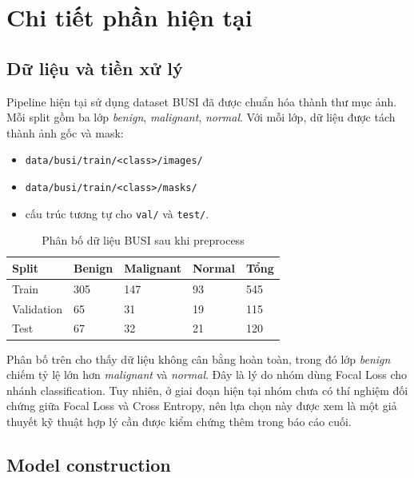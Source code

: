 \documentclass[12pt,a4paper]{article}
\begin{document}
\section{Chi tiết phần hiện tại}

\subsection{Dữ liệu và tiền xử lý}

Pipeline hiện tại sử dụng dataset BUSI đã được chuẩn hóa thành thư mục ảnh. Mỗi split gồm ba lớp \textit{benign}, \textit{malignant}, \textit{normal}. Với mỗi lớp, dữ liệu được tách thành ảnh gốc và mask:

\begin{itemize}
    \item \texttt{data/busi/train/<class>/images/}
    \item \texttt{data/busi/train/<class>/masks/}
    \item cấu trúc tương tự cho \texttt{val/} và \texttt{test/}.
\end{itemize}

\begin{table}[H]
\centering
\caption{Phân bố dữ liệu BUSI sau khi preprocess}
\renewcommand{\arraystretch}{1.25}
\begin{tabular}{p{2.6cm} p{2.5cm} p{2.8cm} p{2.5cm} p{2.5cm}}
\toprule
\textbf{Split} & \textbf{Benign} & \textbf{Malignant} & \textbf{Normal} & \textbf{Tổng} \\
\midrule
Train & 305 & 147 & 93 & 545 \\
Validation & 65 & 31 & 19 & 115 \\
Test & 67 & 32 & 21 & 120 \\
\bottomrule
\end{tabular}
\end{table}

Phân bố trên cho thấy dữ liệu không cân bằng hoàn toàn, trong đó lớp \textit{benign} chiếm tỷ lệ lớn hơn \textit{malignant} và \textit{normal}. Đây là lý do nhóm dùng Focal Loss cho nhánh classification. Tuy nhiên, ở giai đoạn hiện tại nhóm chưa có thí nghiệm đối chứng giữa Focal Loss và Cross Entropy, nên lựa chọn này được xem là một giả thuyết kỹ thuật hợp lý cần được kiểm chứng thêm trong báo cáo cuối.

\subsection{Model construction}
\end{document}
